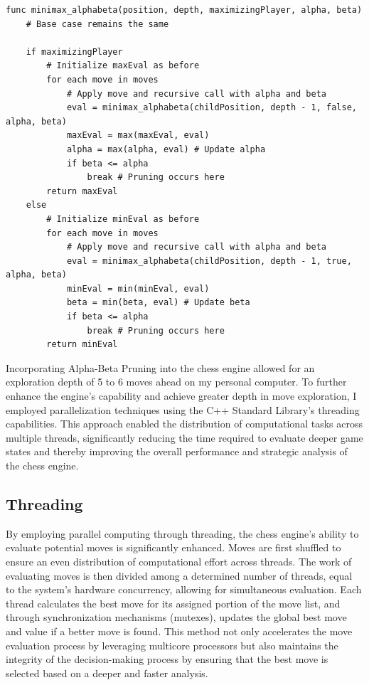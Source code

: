 \documentclass{article}
\begin{document}
\begin{lstlisting}[caption=Pseudo-Code of Alpha-Beta Pruning Enhancements, label=lst:pseudocode]
func minimax_alphabeta(position, depth, maximizingPlayer, alpha, beta)
    # Base case remains the same

    if maximizingPlayer
        # Initialize maxEval as before
        for each move in moves
            # Apply move and recursive call with alpha and beta
            eval = minimax_alphabeta(childPosition, depth - 1, false, alpha, beta)
            maxEval = max(maxEval, eval)
            alpha = max(alpha, eval) # Update alpha
            if beta <= alpha
                break # Pruning occurs here
        return maxEval
    else
        # Initialize minEval as before
        for each move in moves
            # Apply move and recursive call with alpha and beta
            eval = minimax_alphabeta(childPosition, depth - 1, true, alpha, beta)
            minEval = min(minEval, eval)
            beta = min(beta, eval) # Update beta
            if beta <= alpha
                break # Pruning occurs here
        return minEval
\end{lstlisting}


Incorporating Alpha-Beta Pruning into the chess engine allowed for an exploration depth of 5 to 6 moves ahead on my personal computer. To further enhance the engine's capability and achieve greater depth in move exploration, I employed parallelization techniques using the C++ Standard Library's threading capabilities. This approach enabled the distribution of computational tasks across multiple threads, significantly reducing the time required to evaluate deeper game states and thereby improving the overall performance and strategic analysis of the chess engine.


\subsection{Threading}
By employing parallel computing through threading, the chess engine's ability to evaluate potential moves is significantly enhanced. Moves are first shuffled to ensure an even distribution of computational effort across threads. The work of evaluating moves is then divided among a determined number of threads, equal to the system's hardware concurrency, allowing for simultaneous evaluation. Each thread calculates the best move for its assigned portion of the move list, and through synchronization mechanisms (mutexes), updates the global best move and value if a better move is found. This method not only accelerates the move evaluation process by leveraging multicore processors but also maintains the integrity of the decision-making process by ensuring that the best move is selected based on a deeper and faster analysis.
\end{document}
